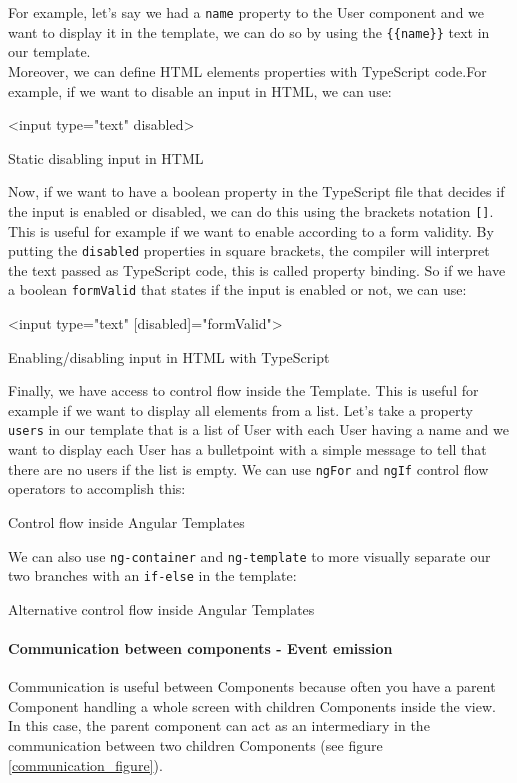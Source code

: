 \documentclass[twoside, openright,11pt,a4paper]{book}
\newenvironment{code}{\captionsetup{type=listing}}{}
\begin{document}
For example, let's say we had a \verb+name+ property to the User component and we want to display it in the template, we can do so by using the \verb+{{name}}+ text in our template.\\

Moreover, we can define HTML elements properties with TypeScript code.For example, if we want to disable an input in HTML, we can use:
\begin{code}
\begin{inlinehtml}
<input type="text" disabled>
\end{inlinehtml}
\caption{Static disabling input in HTML}	
\end{code}
Now, if we want to have a boolean property in the TypeScript file that decides if the input is enabled or disabled, we can do this using the brackets notation \verb+[]+. This is useful for example if we want to enable according to a form validity. By putting the \verb+disabled+ properties in square brackets, the compiler will interpret the text passed as TypeScript code, this is called property binding. So if we have a boolean \verb+formValid+ that states if the input is enabled or not, we can use:
\begin{code}
\begin{inlinehtml}
<input type="text" [disabled]="formValid">
\end{inlinehtml}
\caption{Enabling/disabling input in HTML with TypeScript}	
\end{code}

Finally, we have access to control flow inside the Template. This is useful for example if we want to display all elements from a list. Let's take a property \verb+users+ in our template that is a list of User with each User having a name and we want to display each User has a bulletpoint with a simple message to tell that there are no users if the list is empty. We can use \verb+ngFor+ and \verb+ngIf+ control flow operators to accomplish this:
\begin{code}
	\caption{Control flow inside Angular Templates}
\end{code}
We can also use \verb+ng-container+ and \verb+ng-template+ to more visually separate our two branches with an \verb+if-else+ in the template:
\begin{code}
	\caption{Alternative control flow inside Angular Templates}
\end{code}
\paragraph{Communication between components - Event emission}
\label{communication_components}
Communication is useful between Components because often you have a parent Component handling a whole screen with children Components inside the view. In this case, the parent component can act as an intermediary in the communication between two children Components (see figure \ref{communication_figure}). \\
\end{document}
